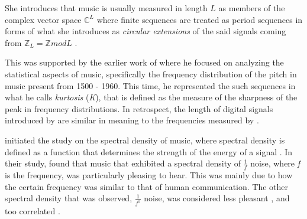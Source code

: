 \begin{comment}
\begin{equation}
\label{eq:1}
l^2(\mathbb{Z}):=\left\{f:\mathbb{Z}\rightarrow\mathbb{C}\sum_{n=-\infty}^\infty|f(n)|^2<\infty \right\}
\end{equation}
Test1
\begin{equation}
\label{eq:2}
(f*g)(n)=\sum_m f(m)g(n-m)
\end{equation}
\end{comment}

She introduces that music is usually measured in length \begin{math}L\end{math} as members of the complex vector space \begin{math}\mathbb{C}^L\end{math} where finite sequences are treated as period sequences in forms of what she introduces as \textit{circular extensions} of the said signals coming from \begin{math}\mathbb{Z}_L = \mathbb{Z} mod L\end{math} \citep{dorfler2001time}. 

This was supported by the earlier work of \citet{fucks1962mathematical} where he focused on analyzing the statistical aspects of music, specifically the frequency distribution of the pitch in music present from 1500 - 1960. This time, he represented the such sequences in what he calls \textit{kurtosis} (\textit{K}), that is defined as the measure of the sharpness of the peak in frequency distributions. In retrospect, the length of digital signals introduced by \cite{dorfler2001time} are similar in meaning to the frequencies measured by \cite{fucks1962mathematical}. 

\begin{comment}
\begin{equation}
\label{eq:3}
K = \frac{\mu^4}{\sigma^4}
\end{equation}

\begin{equation}
\label{eq:4}
\mu_v = \sum_x(x-\overline{x})^v\cdot p_x
\end{equation}

\begin{equation}
\label{eq:5}
\overline{x} = \sum_x\cdot p_x
\end{equation}
\end{comment}

\citet{voss1978noise} initiated the study on the spectral density of music, where spectral density is defined as a function that determines the strength of the energy of a signal \citep{stoica1997introduction, martin2001noise}. In their study, \citeauthor{voss1978noise} found that music that exhibited a spectral density of $\frac{1}{f}$ noise, where \textit{f} is the frequency, was particularly pleasing to hear. This was mainly due to how the certain frequency was similar to that of human communication. The other spectral density that was observed, $\frac{1}{f^2}$ noise, was considered less pleasant \citep{gunduz2005mathematical}, and too correlated \citep{voss1978noise,nettheim1992on}. 

